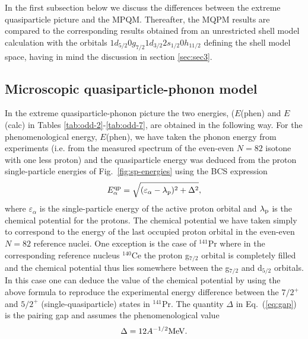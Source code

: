 In the first subsection below we discuss the differences between the
extreme quasiparticle picture and the MPQM. Thereafter, the MQPM results
are compared to the corresponding results obtained from an
unrestricted shell model calculation with the orbitals 
$1d_{5/2}0g_{7/2}1d_{3/2}2s_{1/2}0h_{11/2}$ defining the shell model
space, having in mind the discussion in section \ref{sec:sec3}. 

\subsection{Microscopic quasiparticle-phonon model}


In the extreme quasiparticle-phonon picture the two energies, ($E$(phen)
and $E$(calc) in Tables \ref{tab:odd-2}-\ref{tab:odd-7}, are obtained in 
the following way. 
For the phenomenological energy, $E$(phen), we have taken the phonon energy from experiments
(i.e. from the measured spectrum of the even-even $N=82$ isotone with 
one less proton) and the quasiparticle energy was deduced from the 
proton single-particle energies of Fig.\ \ref{fig:sp-energies} 
using the BCS expression
\begin{equation}
      E_{\alpha}^{\rm qp}=\sqrt{(\varepsilon_{\alpha}-\lambda_{\rm p})^2+
      \Delta^2},
      \label{eq:gap}
\end{equation}
where $\varepsilon_{\alpha}$ is the single-particle energy of the active
proton orbital and $\lambda_{\rm p}$ is the chemical potential for the 
protons. The chemical potential we have taken simply to correspond to the
energy of the last occupied proton orbital in the even-even $N=82$
reference nuclei. One exception is the case of $^{141}$Pr where in the
corresponding reference nucleus $^{140}$Ce the proton g$_{7/2}$ orbital
is completely filled and the chemical potential thus lies somewhere
between the g$_{7/2}$ and d$_{5/2}$ orbitals. In this case one can
deduce the value of the chemical potential by using the above formula
to reproduce the experimental energy difference between the $7/2^+$
and $5/2^+$ (single-quasiparticle) states in $^{141}$Pr.
The quantity $\Delta$ in Eq.\ (\ref{eq:gap}) is the pairing gap and assumes the
phenomenological value
\begin{equation}
     \Delta = 12A^{-1/2} {\rm MeV}.
\end{equation}
